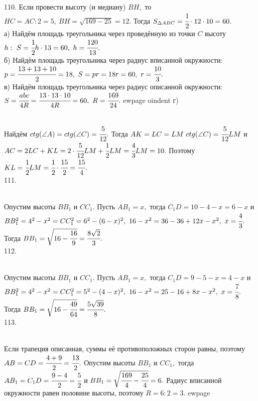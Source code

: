 110. Если провести высоту (и медиану) $BH,$ то $HC=AC:2=5,\ BH=\sqrt{169-25}=12.$ Тогда $S_{\Delta ABC}=\cfrac{1}{2}\cdot12\cdot10=60.$\\
а) Найдём площадь треугольника через проведённую из точки $C$ высоту $h:\ S=\cfrac{1}{2}h\cdot13=60,\ h=\cfrac{120}{13}.$\\
б) Найдём площадь треугольника через радиус вписанной окружности: $p=\cfrac{13+13+10}{2}=18,\ S=pr=18r=60,\ r=\cfrac{10}{3}.$\\
в) Найдём площадь треугольника через радиус описанной окружности: $S=\cfrac{abc}{4R}=\cfrac{13\cdot13\cdot10}{4R}=60,\ R=\cfrac{169}{24}.$
ewpage
oindent
г) \begin{figure}[ht!]
\end{figure}\\
Найдём $ctg(\angle A)=ctg(\angle C)=\cfrac{5}{12}.$ Тогда $AK=LC=LM\ ctg(\angle C)=\cfrac{5}{12}LM$ и $AC=2LC+KL=2\cdot\cfrac{5}{12}LM+\cfrac{1}{2}LM=\cfrac{4}{3}LM=10.$ Поэтому $KL=\cfrac{1}{2}LM=\cfrac{1}{2}\cdot\cfrac{15}{2}=\cfrac{15}{4}.$\\
111. \begin{figure}[ht!]
\end{figure}\\
Опустим высоты $BB_1$ и $CC_1.$ Пусть $AB_1=x,$ тогда $C_1D=10-4-x=6-x$ и $BB_1^2=4^2-x^2=CC_1^2=6^2-(6-x)^2,\ 16-x^2=36-36+12x-x^2,\ x=\cfrac{4}{3}.$ Тогда $BB_1=\sqrt{16-\cfrac{16}{9}}=\cfrac{8\sqrt{2}}{3}.$\\
112. \begin{figure}[ht!]
\end{figure}\\
Опустим высоты $BB_1$ и $CC_1.$ Пусть $AB_1=x,$ тогда $C_1D=9-5-x=4-x$ и $BB_1^2=4^2-x^2=CC_1^2=5^2-(4-x)^2,\ 16-x^2=25-16+8x-x^2,\ x=\cfrac{7}{8}.$ Тогда $BB_1=\sqrt{16-\cfrac{49}{64}}=\cfrac{5\sqrt{39}}{8}.$\\
113. \begin{figure}[ht!]
\end{figure}\\
Если трапеция описанная, суммы её противоположных сторон равны, поэтому $AB=CD=\cfrac{4+9}{2}=\cfrac{13}{2}.$ Опустим высоты $BB_1$ и $CC_1,$ тогда $AB_1=C_1D=\cfrac{9-4}{2}=\cfrac{5}{2}$ и $BB_1=\sqrt{\cfrac{169}{4}-\cfrac{25}{4}}=6.$ Радиус вписанной окружности равен половине высоты, поэтому $R=6:2=3.$
ewpage
